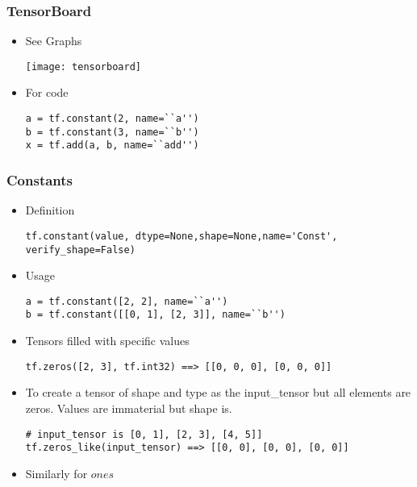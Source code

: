 \begin{frame}[fragile] \frametitle{TensorBoard}
\begin{itemize}
\item See Graphs
\begin{center}
\texttt{[image: tensorboard]}
\end{center}
\item For code
\begin{lstlisting}
a = tf.constant(2, name=``a'')
b = tf.constant(3, name=``b'')
x = tf.add(a, b, name=``add'')
\end{lstlisting}
\end{itemize}
\end{frame}


\begin{frame}[fragile] \frametitle{Constants}
\begin{itemize}
\item Definition
\begin{lstlisting}
tf.constant(value, dtype=None,shape=None,name='Const', verify_shape=False)
\end{lstlisting}
\item Usage
\begin{lstlisting}
a = tf.constant([2, 2], name=``a'')
b = tf.constant([[0, 1], [2, 3]], name=``b'')
\end{lstlisting}
\item Tensors filled with specific values
\begin{lstlisting}
tf.zeros([2, 3], tf.int32) ==> [[0, 0, 0], [0, 0, 0]]
\end{lstlisting}
\item To create a tensor of shape and type as the input\_tensor but all elements are zeros. Values are immaterial but shape is.
\begin{lstlisting}
# input_tensor is [0, 1], [2, 3], [4, 5]]
tf.zeros_like(input_tensor) ==> [[0, 0], [0, 0], [0, 0]]
\end{lstlisting}
\item Similarly for $ones$
\end{itemize}
\end{frame}

